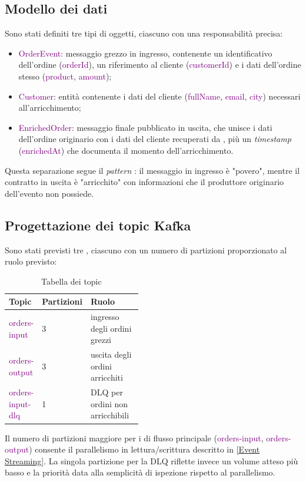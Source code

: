 \subsection{Modello dei dati}
\label{Modello dei dati}
Sono stati definiti tre tipi di oggetti, ciascuno con una responsabilità precisa:
\begin{itemize}
    \item \textcolor{purple}{OrderEvent}: messaggio grezzo in ingresso, contenente un identificativo dell'ordine (\textcolor{purple}{orderId}), un riferimento al cliente (\textcolor{purple}{customerId}) e i dati dell'ordine stesso (\textcolor{purple}{product}, \textcolor{purple}{amount});
    \item \textcolor{purple}{Customer}: entità contenente i dati del cliente (\textcolor{purple}{fullName}, \textcolor{purple}{email}, \textcolor{purple}{city}) necessari all'arricchimento;
    \item \textcolor{purple}{EnrichedOrder}: messaggio finale pubblicato in uscita, che unisce i dati dell'ordine originario con i dati del cliente recuperati da , più un \textit{timestamp} (\textcolor{purple}{enrichedAt}) che documenta il momento dell'arricchimento.
\end{itemize}
Questa separazione segue il \textit{pattern} : il messaggio in ingresso è  "povero", mentre il contratto in uscita è "arricchito" con informazioni che il produttore originario dell'evento non possiede.

\subsection{Progettazione dei topic Kafka}
\label{Progettazione dei topic Kafka}
Sono stati previsti tre \textit{}, ciascuno con un numero di partizioni proporzionato al ruolo previsto:
\begin{table}[H]
    \setlength{\tabcolsep}{10pt} %
    \def\arraystretch{1.5} %
    \centering
    \begin{tabular}{|l|l|p{0.45\linewidth}|}
        \hline
        \textbf{Topic} & \textbf{Partizioni} & \textbf{Ruolo} \\ \hline
        \textcolor{purple}{orders-input} & 3 & ingresso degli ordini grezzi \\ \hline
        \textcolor{purple}{orders-output} & 3 & uscita degli ordini arricchiti \\ \hline
        \textcolor{purple}{orders-input-dlq} & 1 & \acrshort{DLQ} per ordini non arricchibili \\ \hline
    \end{tabular}
    \caption{Tabella dei topic}
    \label{Tabella dei topic}
\end{table}
\noindent
Il numero di partizioni maggiore per i \textit{} di flusso principale (\textcolor{purple}{orders-input}, \textcolor{purple}{orders-output}) consente il parallelismo in \sloppy lettura/scrittura descritto in \ref{Event Streaming}.
La singola partizione per la \acrshort{DLQ} riflette invece un volume atteso più basso e la priorità data alla semplicità di ispezione rispetto al parallelismo.

